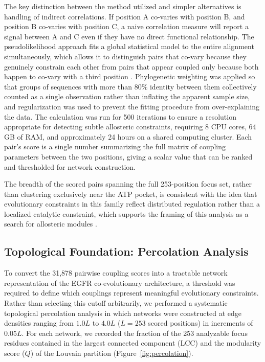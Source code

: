 \documentclass[utf8]{FrontiersinHarvard}
\begin{document}
The key distinction between the method utilized and simpler alternatives is handling of indirect correlations. If position A co-varies with position B, and position B co-varies with position C, a naive correlation measure will report a signal between A and C even if they have no direct functional relationship. The pseudolikelihood approach fits a global statistical model to the entire alignment simultaneously, which allows it to distinguish pairs that co-vary because they genuinely constrain each other from pairs that appear coupled only because both happen to co-vary with a third position \citep{Ekeberg2013,Halabi2009}. Phylogenetic weighting was applied so that groups of sequences with more than 80\% identity between them collectively counted as a single observation rather than inflating the apparent sample size, and regularization was used to prevent the fitting procedure from over-explaining the data. The calculation was run for 500 iterations to ensure a resolution appropriate for detecting subtle allosteric constraints, requiring 8 CPU cores, 64 GB of RAM, and approximately 24 hours on a shared computing cluster. Each pair's score is a single number summarizing the full matrix of coupling parameters between the two positions, giving a scalar value that can be ranked and thresholded for network construction.

The breadth of the scored pairs spanning the full 253-position focus set, rather than clustering exclusively near the ATP pocket, is consistent with the idea that evolutionary constraints in this family reflect distributed regulation rather than a localized catalytic constraint, which supports the framing of this analysis as a search for allosteric modules \citep{AstlVerkhivker2019,Sutto2015}.

\subsection{Topological Foundation: Percolation Analysis}

To convert the 31,878 pairwise coupling scores into a tractable network representation of the EGFR co-evolutionary architecture, a threshold was required to define which couplings represent meaningful evolutionary constraints. Rather than selecting this cutoff arbitrarily, we performed a systematic topological percolation analysis in which networks were constructed at edge densities ranging from $1.0L$ to $4.0L$ ($L = 253$ scored positions) in increments of $0.05L$. For each network, we recorded the fraction of the 253 analyzable focus residues contained in the largest connected component (LCC) and the modularity score ($Q$) of the Louvain partition (Figure~\ref{fig:percolation}).
\end{document}
